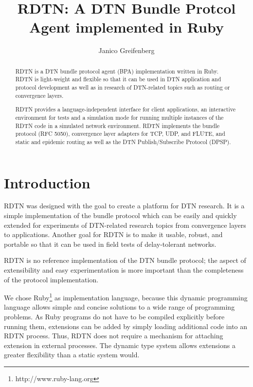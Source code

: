 \documentclass[a4paper]{article}
\begin{document}
\title{RDTN: A DTN Bundle Protcol Agent implemented in Ruby}

\author{Janico Greifenberg}

\maketitle

\begin{abstract}

RDTN is a DTN bundle protocol agent (BPA) implementation written in Ruby. RDTN
is light-weight and flexible so that it can be used in DTN application and
protocol development as well as in research of DTN-related topics such as
routing or convergence layers. 

RDTN provides a language-independent interface for client applications, an
interactive environment for tests and a simulation mode for running multiple
instances of the RDTN code in a simulated network environment. RDTN implements
the bundle protocol (RFC 5050), convergence layer adapters for TCP, UDP, and
FLUTE, and static and epidemic routing as well as the DTN Publish/Subscribe
Protocol (DPSP).

\end{abstract}

\section{Introduction}\label{sec.intro}

RDTN was designed with the goal to create a platform for DTN research. It is a
simple implementation of the bundle protocol which can be easily and quickly
extended for experiments of DTN-related research topics from convergence layers
to applications. Another goal for RDTN is to make it usable, robust, and
portable so that it can be used in field tests of delay-tolerant networks.

RDTN is no reference implementation of the DTN bundle protocol; the aspect of
extensibility and easy experimentation is more important than the
completeness of the protocol implementation.

We chose Ruby\footnote{http://www.ruby-lang.org} as implementation language,
because this dynamic programming language allows simple and concise solutions to
a wide range of programming problems. As Ruby programs do not have to be
compiled explicitly before running them, extensions can be added by simply
loading additional code into an RDTN process. Thus, RDTN does not require a
mechanism for attaching extension in external processes. The dynamic type system
allows extensions a greater flexibility than a static system would.
\end{document}
